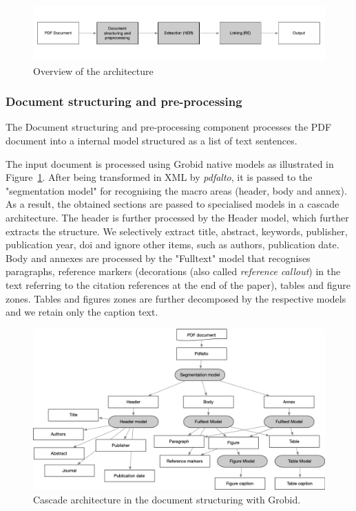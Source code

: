 \documentclass{article}
\begin{document}
\begin{figure}[ht]
\includegraphics[width=\textwidth]{overview-schema}
\caption{Overview of the architecture}
\end{figure}

\subsubsection{Document structuring and pre-processing}
The Document structuring and pre-processing component processes the PDF document into a internal model structured as a list of text sentences.

The input document is processed using Grobid native models as illustrated in Figure~\ref{fig:grobid-document-processing}. After being transformed in XML by \textit{pdfalto}, it is passed to the "segmentation model" for recognising the macro areas (header, body and annex). As a result, the obtained sections are passed to specialised models in a cascade architecture. The header is further processed by the Header model, which further extracts the structure. We selectively extract title, abstract, keywords, publisher, publication year, doi and ignore other items, such as authors, publication date. 
Body and annexes are processed by the "Fulltext" model that recognises paragraphs, reference markers (decorations (also called \textit{reference callout}) in the text referring to the citation references at the end of the paper), tables and figure zones.
Tables and figures zones are further decomposed by the respective models and we retain only the caption text. 

\begin{figure}[ht]
\label{fig:grobid-document-processing}
\includegraphics[width=\textwidth]{grobid-extraction-schema}
\caption{Cascade architecture in the document structuring with Grobid.}
\end{figure}
\end{document}
